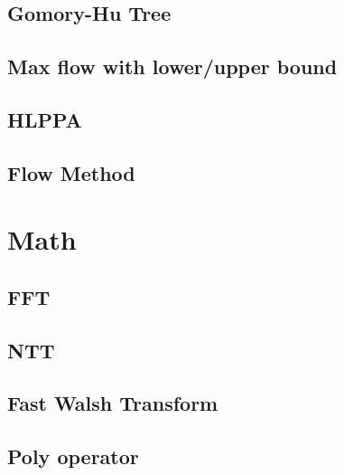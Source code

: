 \documentclass[a4paper,10pt,twocolumn,oneside]{article}
\begin{document}
%

\subsection{Gomory-Hu Tree}


\subsection{Max flow with lower/upper bound}


%

\subsection{HLPPA}


\subsection{Flow Method}


\section{Math}
\subsection{FFT}


\subsection{NTT}


\subsection{Fast Walsh Transform}


\subsection{Poly operator}

\end{document}
